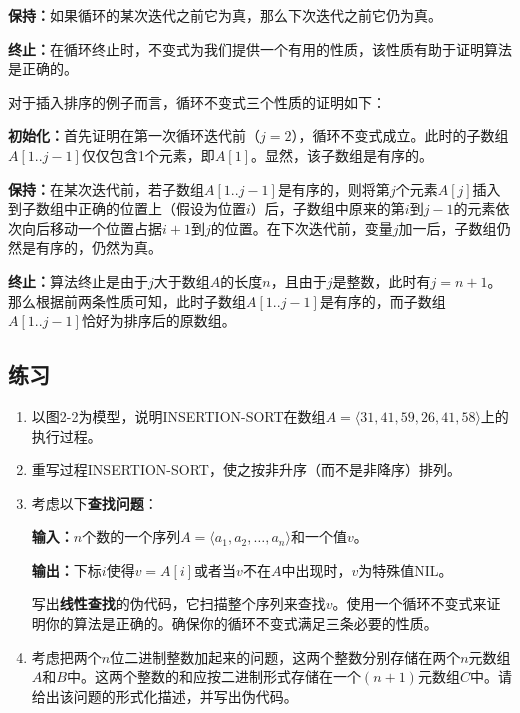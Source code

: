 \documentclass[UTF8,a4paper,zihao=-4,oneside,onecolumn,scheme=chinese,autoindent=true]{ctexbook}
\begin{document}
\textbf{保持：}如果循环的某次迭代之前它为真，那么下次迭代之前它仍为真。

\textbf{终止：}在循环终止时，不变式为我们提供一个有用的性质，该性质有助于证明算法是正确的。

对于插入排序的例子而言，循环不变式三个性质的证明如下：

\textbf{初始化：}首先证明在第一次循环迭代前（$j=2$），循环不变式成立。此时的子数组$A[1..j-1]$仅仅包含1个元素，即$A[1]$。显然，该子数组是有序的。

\textbf{保持：}在某次迭代前，若子数组$A[1..j-1]$是有序的，则将第$j$个元素$A[j]$插入到子数组中正确的位置上（假设为位置$i$）后，子数组中原来的第$i$到$j-1$的元素依次向后移动一个位置占据$i+1$到$j$的位置。在下次迭代前，变量$j$加一后，子数组仍然是有序的，仍然为真。

\textbf{终止：}算法终止是由于$j$大于数组$A$的长度$n$，且由于$j$是整数，此时有$j=n+1$。那么根据前两条性质可知，此时子数组$A[1..j-1]$是有序的，而子数组$A[1..j-1]$恰好为排序后的原数组。

\subsection*{练习}
\begin{enumerate}
    \renewcommand{\labelenumi}{\thesection-\theenumi}
    \item 以图2-2为模型，说明INSERTION-SORT在数组$A=\langle 31,41,59,26,41,58 \rangle$上的执行过程。
    \item 重写过程INSERTION-SORT，使之按非升序（而不是非降序）排列。
    \item {
          考虑以下\textbf{查找问题}：

          \textbf{输入：}$n$个数的一个序列$A=\langle a_{1},a_{2},\dots,a_{n} \rangle$和一个值$v$。

          \textbf{输出：}下标$i$使得$v=A[i]$或者当$v$不在$A$中出现时，$v$为特殊值NIL。

          写出\textbf{线性查找}的伪代码，它扫描整个序列来查找$v$。使用一个循环不变式来证明你的算法是正确的。确保你的循环不变式满足三条必要的性质。
          }
    \item 考虑把两个$n$位二进制整数加起来的问题，这两个整数分别存储在两个$n$元数组$A$和$B$中。这两个整数的和应按二进制形式存储在一个$(n+1)$元数组$C$中。请给出该问题的形式化描述，并写出伪代码。
\end{enumerate}
\end{document}
